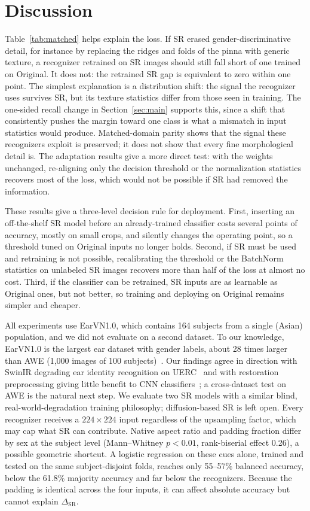 \documentclass[conference]{IEEEtran}
\begin{document}
\section{Discussion}\label{sec:discussion}
Table~\ref{tab:matched} helps explain the loss. If SR erased gender-discriminative detail, for instance by replacing the ridges and folds of the pinna with generic texture, a recognizer retrained on SR images should still fall short of one trained on Original. It does not: the retrained SR gap is equivalent to zero within one point. The simplest explanation is a distribution shift: the signal the recognizer uses survives SR, but its texture statistics differ from those seen in training. The one-sided recall change in Section~\ref{sec:main} supports this, since a shift that consistently pushes the margin toward one class is what a mismatch in input statistics would produce. Matched-domain parity shows that the signal these recognizers exploit is preserved; it does not show that every fine morphological detail is. The adaptation results give a more direct test: with the weights unchanged, re-aligning only the decision threshold or the normalization statistics recovers most of the loss, which would not be possible if SR had removed the information.

These results give a three-level decision rule for deployment. First, inserting an off-the-shelf SR model before an already-trained classifier costs several points of accuracy, mostly on small crops, and silently changes the operating point, so a threshold tuned on Original inputs no longer holds. Second, if SR must be used and retraining is not possible, recalibrating the threshold or the BatchNorm statistics on unlabeled SR images recovers more than half of the loss at almost no cost. Third, if the classifier can be retrained, SR inputs are as learnable as Original ones, but not better, so training and deploying on Original remains simpler and cheaper.

All experiments use EarVN1.0, which contains 164 subjects from a single (Asian) population, and we did not evaluate on a second dataset. To our knowledge, EarVN1.0 is the largest ear dataset with gender labels, about 28 times larger than AWE (1{,}000 images of 100 subjects)~\cite{emersic2017}. Our findings agree in direction with SwinIR degrading ear identity recognition on UERC~\cite{markicevic2023} and with restoration preprocessing giving little benefit to CNN classifiers~\cite{pei2021}; a cross-dataset test on AWE is the natural next step. We evaluate two SR models with a similar blind, real-world-degradation training philosophy; diffusion-based SR is left open. Every recognizer receives a $224\times224$ input regardless of the upsampling factor, which may cap what SR can contribute. Native aspect ratio and padding fraction differ by sex at the subject level (Mann--Whitney $p<0.01$, rank-biserial effect 0.26), a possible geometric shortcut. A logistic regression on these cues alone, trained and tested on the same subject-disjoint folds, reaches only 55--57\% balanced accuracy, below the 61.8\% majority accuracy and far below the recognizers. Because the padding is identical across the four inputs, it can affect absolute accuracy but cannot explain $\Delta_{\text{SR}}$.
\end{document}
